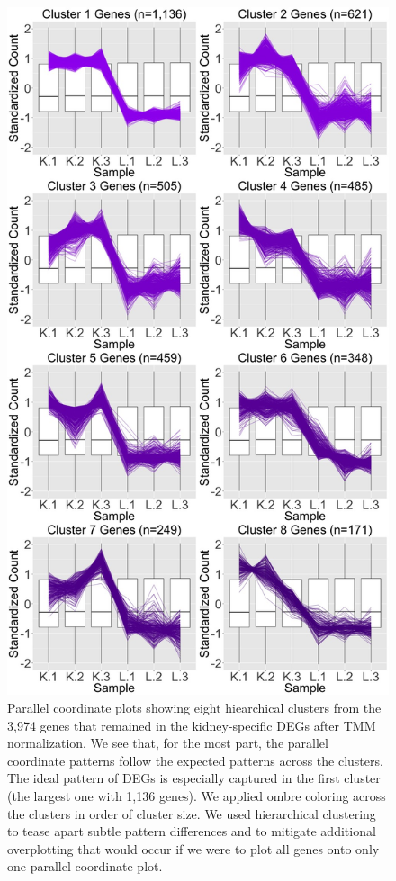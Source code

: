 \documentclass[11pt,a4paper,oldfontcommands,openany]{memoir}
\numberwithin{equation}{section} %
\begin{document}
\null
\begin{figure}[t!]
\begin{framed}
\centerline{\includegraphics[width=0.65\columnwidth]{MakeFigures/lkClustersKeep.jpg}}
\end{framed}
\caption{Parallel coordinate plots showing eight hiearchical clusters from the 3,974 genes that remained in the kidney-specific DEGs after TMM normalization. We see that, for the most part, the parallel coordinate patterns follow the expected patterns across the clusters. The ideal pattern of DEGs is especially captured in the first cluster (the largest one with 1,136 genes). We applied ombre coloring across the clusters in order of cluster size. We used hierarchical clustering to tease apart subtle pattern differences and to mitigate additional overplotting that would occur if we were to plot all genes onto only one parallel coordinate plot.
\label{lkClustersKeep}}
\end{figure}
\end{document}
